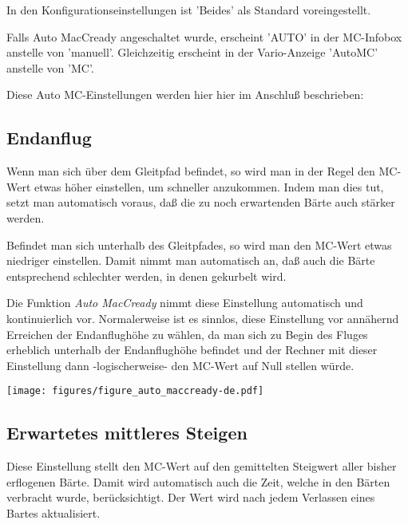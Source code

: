 In den Konfigurationseinstellungen ist  'Beides' als Standard voreingestellt.

Falls Auto MacCready angeschaltet wurde, erscheint 'AUTO'  in der MC-Infobox
anstelle von 'manuell'. Gleichzeitig erscheint in der Vario-Anzeige 'AutoMC' anstelle von 'MC'.

Diese Auto MC-Einstellungen werden hier hier im Anschluß beschrieben:

\subsection*{Endanflug}
Wenn man sich über dem Gleitpfad befindet, so wird man in der Regel den MC-Wert etwas höher einstellen,
um schneller anzukommen. Indem man dies tut, setzt man automatisch voraus, daß die zu noch erwartenden
Bärte auch stärker werden.

Befindet man sich unterhalb des Gleitpfades, so wird man den MC-Wert etwas niedriger einstellen.
Damit nimmt man automatisch an, daß auch die Bärte entsprechend schlechter werden, in denen gekurbelt wird.

Die Funktion \textsl{Auto MacCready} nimmt diese Einstellung automatisch und kontinuierlich vor.
Normalerweise ist es sinnlos, diese Einstellung vor annähernd Erreichen der Endanflughöhe  zu wählen, da man sich
zu Begin des Fluges erheblich unterhalb der Endanflughöhe befindet und der Rechner mit dieser Einstellung dann
-logischerweise- den MC-Wert auf Null stellen würde.


\begin{maxipage}
\begin{center}
\texttt{[image: figures/figure\_auto\_maccready-de.pdf]}
\end{center}
\end{maxipage}

\subsection*{Erwartetes mittleres Steigen}

Diese Einstellung stellt den MC-Wert auf den gemittelten Steigwert aller bisher erflogenen Bärte.
Damit wird automatisch auch die Zeit, welche in den Bärten verbracht wurde, berücksichtigt.
Der Wert wird nach jedem Verlassen eines Bartes aktualisiert.

